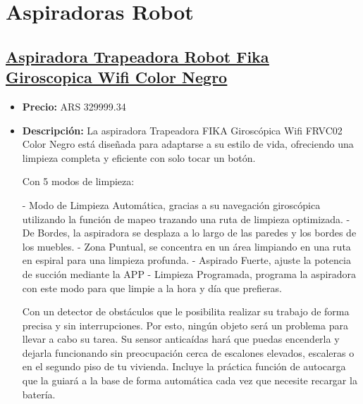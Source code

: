 \documentclass{article}
\begin{document}
\section*{Aspiradoras Robot}
\setcounter{subsection}{0} %

\begin{adjustwidth}{2em}{}

\subsection{\uline{\href{https://www.mercadolibre.com.ar/aspiradora-trapeadora-robot-fika-giroscopica-wifi-color-negro/p/MLA29751158}{Aspiradora Trapeadora Robot Fika Giroscopica Wifi Color Negro}}}
\begin{itemize}
    \item \textbf{Precio:} ARS 329999.34
    \item \textbf{Descripción:} La aspiradora Trapeadora FIKA Giroscópica Wifi FRVC02 Color Negro está diseñada para adaptarse a su estilo de vida, ofreciendo una limpieza completa y eficiente con solo tocar un botón.

Con 5 modos de limpieza:

- Modo de Limpieza Automática, gracias a su navegación giroscópica utilizando la función de mapeo trazando una ruta de limpieza optimizada.
- De Bordes, la aspiradora se desplaza a lo largo de las paredes y los bordes de los muebles. 
- Zona Puntual, se concentra en un área limpiando en una ruta en espiral para una limpieza profunda.
- Aspirado Fuerte, ajuste la potencia de succión mediante la APP
- Limpieza Programada, programa la aspiradora con este modo para que limpie a la hora y día que prefieras. 

Con un detector de obstáculos que le posibilita realizar su trabajo de forma precisa y sin interrupciones. Por esto, ningún objeto será un problema para llevar a cabo su tarea. 
Su sensor anticaídas hará que puedas encenderla y dejarla funcionando sin preocupación cerca de escalones elevados, escaleras o en el segundo piso de tu vivienda. Incluye la práctica función de autocarga que la guiará a la base de forma automática cada vez que necesite recargar la batería.


\end{itemize}
\end{adjustwidth}
\end{document}
